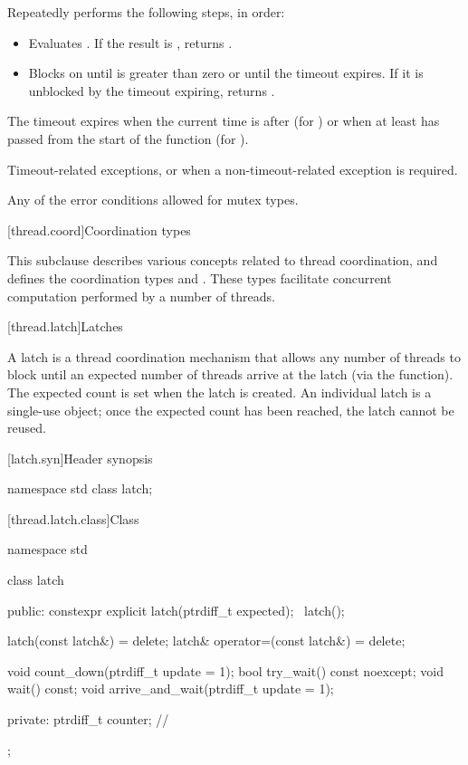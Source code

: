 \begin{itemdescr}
\pnum
\effects
Repeatedly performs the following steps, in order:
\begin{itemize}
\item
  Evaluates .
  If the result is , returns .
\item
  Blocks on 
  until  is greater than zero or until the timeout expires.
  If it is unblocked by the timeout expiring, returns .
\end{itemize}
The timeout expires
when the current time is after  (for )
or when at least  has passed
from the start of the function (for ).

\pnum
\throws
Timeout-related exceptions, or 
when a non-timeout-related exception is required.

\pnum
\errors
Any of the error conditions
allowed for mutex types.
\end{itemdescr}

[thread.coord]{Coordination types}

\pnum
This subclause describes various concepts related to thread coordination, and
defines the coordination types  and .
These types facilitate concurrent computation performed by a number of threads.

[thread.latch]{Latches}

\pnum
A latch is a thread coordination mechanism
that allows any number of threads to block
until an expected number of threads arrive at the latch
(via the  function).
The expected count is set when the latch is created.
An individual latch is a single-use object;
once the expected count has been reached, the latch cannot be reused.

[latch.syn]{Header  synopsis}
%

\begin{codeblock}
namespace std {
  class latch;
}
\end{codeblock}

[thread.latch.class]{Class }

\begin{codeblock}
namespace std {
  class latch {
  public:
    constexpr explicit latch(ptrdiff_t expected);
    ~latch();

    latch(const latch&) = delete;
    latch& operator=(const latch&) = delete;

    void count_down(ptrdiff_t update = 1);
    bool try_wait() const noexcept;
    void wait() const;
    void arrive_and_wait(ptrdiff_t update = 1);

  private:
    ptrdiff_t counter;  // \expos
  };
}
\end{codeblock}

